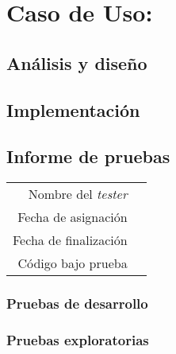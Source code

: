 \section{Caso de Uso:}

\subsection{Análisis y diseño}

\subsection{Implementación}

\subsection{Informe de pruebas}

{\small
\begin{tabular}{r|l}
Nombre del \textit{tester} & \\
Fecha de asignación & \\
Fecha de finalización & \\
Código bajo prueba &
\end{tabular}
}

\subsubsection{Pruebas de desarrollo}

\subsubsection{Pruebas exploratorias}

